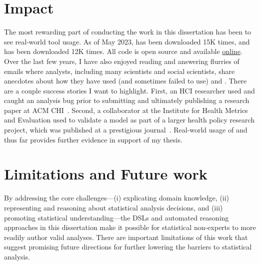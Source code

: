 \section{Impact} \label{sec:impact}
The most rewarding part of conducting the work in this dissertation has been to
see real-world tool usage. As of May 2023, \tea has been downloaded 15K
times, and \tisane has been downloaded 12K times. All code
is open source and available \href{https://github.com/tea-lang-org}{online}.
Over the last few years, I have also enjoyed reading and answering flurries of
emails where analysts, including many scientists and social scientists, share
anecdotes about how they have used (and sometimes failed to use) \tea and \tisane.
There are a couple success stories I want to highlight. First, an HCI researcher
used \tisane and caught an analysis bug prior to submitting and ultimately
publishing a research paper at ACM CHI~\cite{baughan2022dissociation}. Second, a
collaborator at the Institute for Health Metrics and Evaluation used \tisane to validate a model as part of a larger health
policy research project, which was published at a prestigious
journal~\cite{johnson2022varied}.
Real-world usage of \tea and \tisane thus far provides further evidence in support of my thesis.

\section{Limitations and Future work} \label{sec:futureWork}
By addressing the core challenges---(i) explicating domain knowledge,
(ii) representing and reasoning about statistical analysis decisions, and (iii)
promoting statistical understanding---the DSLs and automated reasoning
approaches in this dissertation make it possible for statistical non-experts to
more readily author valid analyses. There are important limitations of this work
that suggest promising future directions for further lowering the barriers to
statistical analysis. 

